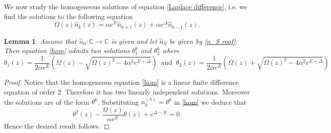 \documentclass{article}
\numberwithin{equation}{section}
\theoremstyle{plain}
\newtheorem{lemma}[theorem]{Lemma}
\begin{document}
We now study the homogeneous solutions of equation \eqref{Laplace difference}, i.e. we find the solutions to the following equation
\begin{equation} \label{hom}
\Omega (z) \hat {n}_k(z) = \alpha e^E \hat{n}_{k+1}(z)  + \alpha e^{\Delta} \hat{n}_{k-1}(z).
\end{equation}
\begin{lemma}
Assume that $\hat{n}_0: \mathbb C \rightarrow \mathbb C $ is given and let $\hat{n}_S $ be given by \eqref{n_S roof}. 
Then equation \eqref{hom}
admits two solutions $\theta_1^k $ and $\theta_2^k$ where 
\begin{equation} \label{teta1 and teta2}
\theta_1(z) = \frac{1}{2 \alpha e^E } \left( \Omega(z)-\sqrt{\Omega(z)^2 - 4 \alpha^2 e^{E+\Delta}} \right) \ \text{ and } \ \theta_2(z) = \frac{1}{2 \alpha e^E } \left( \Omega(z)+\sqrt{\Omega(z)^2 - 4 \alpha^2 e^{E+\Delta}} \right) 
\end{equation}
\end{lemma}
\begin{proof}
    Notice that the homogeneous equation \eqref{hom} is a linear finite difference equation of order $2.$
    Therefore it has two linearly independent solutions.
    Moreover the solutions are of the form $\theta^k$. Substituting $n_k^{(h)} = \theta^k $ in \eqref{hom} we deduce that
\begin{equation} \label{polinomio hom}
\theta^2(z) -\frac{ \Omega(z) }{\alpha e^E} \theta(z)  +  e^{\Delta - E}=0. 
\end{equation}
Hence the desired result follows. 
\end{proof}
\end{document}
